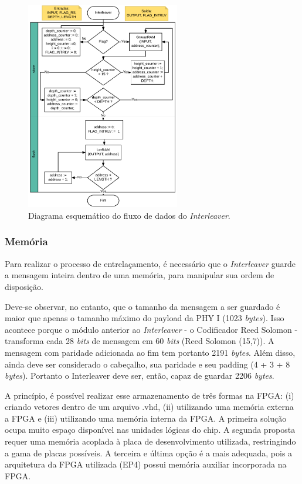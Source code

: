 	\begin{figure}[h!]
		\caption{\label{figure:interleaver-flow}Diagrama esquemático do fluxo de dados do \textit{Interleaver}.}
		\centering
		\includegraphics[width=0.6\textwidth]{interleaver/flow.pdf}
	\end{figure}

	\subsubsection{Memória}

	Para realizar o processo de entrelaçamento, é necessário que o \textit{Interleaver} guarde a mensagem inteira dentro de uma memória, para manipular sua ordem de disposição.

	Deve-se observar, no entanto, que o tamanho da mensagem a ser guardado é maior que apenas o tamanho máximo do payload da PHY I (1023 \textit{bytes}). Isso acontece porque o módulo anterior ao \textit{Interleaver} - o Codificador Reed Solomon - transforma cada 28 \textit{bits} de mensagem em 60 \textit{bits} (Reed Solomon (15,7)). A mensagem com paridade adicionada ao fim tem portanto 2191 \textit{bytes}. Além disso, ainda deve ser considerado o cabeçalho, sua paridade e seu padding (4 + 3 + 8 \textit{bytes}). Portanto o Interleaver deve ser, então, capaz de guardar 2206 \textit{bytes}.

	A princípio, é possível realizar esse armazenamento de três formas na FPGA: (i) criando vetores dentro de um arquivo .vhd, (ii) utilizando uma memória externa a FPGA e (iii) utilizando uma memória interna da FPGA. A primeira solução ocupa muito espaço disponível nas unidades lógicas do chip. A segunda proposta requer uma memória acoplada à placa de desenvolvimento utilizada, restringindo a gama de placas possíveis. A terceira e última opção é a mais adequada, pois a arquitetura da FPGA utilizada (EP4) possui memória auxiliar incorporada na FPGA.


